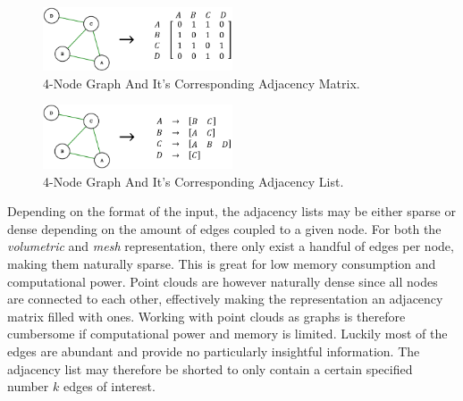 \documentclass[%
]{USN-MSc}
\begin{document}
\begin{figure}[H]
  \centering
  \includegraphics[width=0.5\textwidth]{fig/Adjecency Matrix.png}
  \caption{4-Node Graph And It's Corresponding Adjacency Matrix.}
  \label{fig:Adjacency Matrix}
\end{figure}
\begin{figure}[H]
  \centering
  \includegraphics[width=0.5\textwidth]{fig/Adjecency List.png}
  \caption{4-Node Graph And It's Corresponding Adjacency List.}
  \label{fig:Adjacency List}
\end{figure}


Depending on the format of the input, the adjacency lists may be either sparse or dense depending on the amount of edges coupled to a given node. For both the \textit{volumetric} and \textit{mesh} representation, there only exist a handful of edges per node, making them naturally sparse. This is great for low memory consumption and computational power. Point clouds are however naturally dense since all nodes are connected to each other, effectively making the representation an adjacency matrix filled with ones. Working with point clouds as graphs is therefore cumbersome if computational power and memory is limited. Luckily most of the edges are abundant and provide no particularly insightful information. The adjacency list may therefore be shorted to only contain a certain specified number \(k\) edges of interest.
\clearpage
\end{document}
